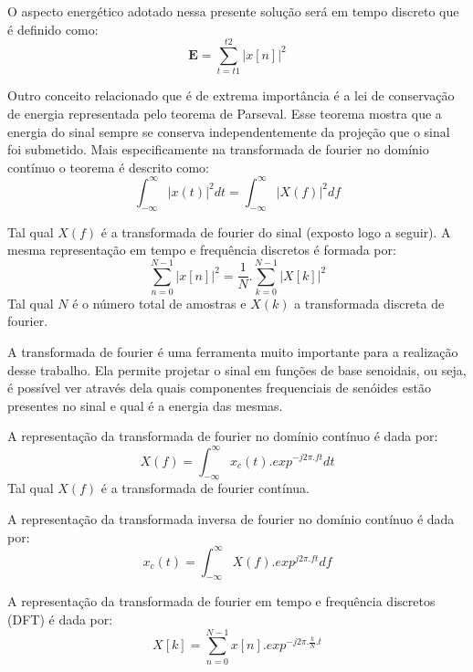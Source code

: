 O aspecto energético adotado nessa presente solução será em tempo discreto que é definido como:
\begin{equation}
\label{eqn07}
	\mathbf{E} = \sum_{t=t1}^{t2}{|x[n]|^{2}} 
\end{equation}

Outro conceito relacionado que é de extrema importância é a lei de conservação de energia representada pelo teorema de Parseval. Esse teorema mostra que a energia do sinal sempre se conserva independentemente da projeção que o sinal foi submetido. Mais especificamente na transformada de fourier no domínio contínuo o teorema é descrito como:  
\begin{equation}
\label{eqn08}
	\int_{-\infty}^{\infty}{|x(t)|^{2}dt} = \int_{-\infty}^{\infty}{|X(f)|^{2}df}
\end{equation}

Tal qual $X(f)$ é a transformada de fourier do sinal (exposto logo a seguir).
A mesma representação em tempo e frequência discretos é formada por:
\begin{equation}
\label{eqn09}
	\sum_{n=0}^{N - 1}{|x[n]|^{2}} =  \frac{1}{N}.\sum_{k=0}^{N - 1}{|X[k]|^{2}}
\end{equation}
Tal qual $N$ é o número total de amostras e $X(k)$ a transformada discreta de fourier.

A transformada de fourier é uma ferramenta muito importante para a realização desse trabalho. Ela permite projetar o sinal em funções de base senoidais, ou seja, é possível ver através dela quais componentes frequenciais de senóides estão presentes no sinal e qual é a energia das mesmas.

A representação da transformada de fourier no domínio contínuo é dada por:
\begin{equation}
\label{eqn10}
	X(f) = \int_{-\infty}^{\infty}{x_c(t).{exp}^{-j2\pi.ft}dt}
\end{equation}
Tal qual $X(f)$ é a transformada de fourier contínua.

A representação da transformada inversa de fourier no domínio contínuo é dada por:
\begin{equation}
\label{eqn11}
	x_c(t) = \int_{-\infty}^{\infty}{X(f).{exp}^{j2\pi.ft}df}
\end{equation}

A representação da transformada de fourier em tempo e frequência discretos (DFT) é dada por:
\begin{equation}
\label{eqn12}
	X[k] = \sum_{n=0}^{N - 1}{x[n].{exp}^{-j2\pi.\frac{k}{N}.t}}
\end{equation}

